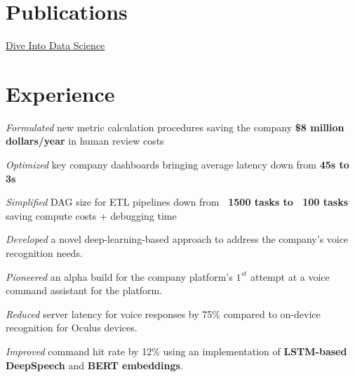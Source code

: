 \documentclass[]{devanshu-resume-openfont}
\begin{document}
\begin{minipage}[t]{0.33\textwidth}
\section{Publications}
\href{https://eldridgejm.github.io/dive_into_data_science/front.html}{Dive Into Data Science}

%
%

\end{minipage}
\hfill
\begin{minipage}[t]{0.66\textwidth}


\section{Experience}
\vspace{\topsep} %
\begin{tightemize}
\item \emph{Formulated} new metric calculation procedures saving the company \textbf{\$8 million dollars/year} in human review costs
\item \emph{Optimized} key company dashboards bringing average latency down from \textbf{45s to 3s}
\item \emph{Simplified} DAG size for ETL pipelines down from \textbf{~1500 tasks to ~100 tasks} saving compute costs + debugging time
\end{tightemize}
\sectionsep

\vspace{\topsep} %
\begin{tightemize}
\item \emph{Developed} a novel deep-learning-based approach to address the company's voice recognition needs.
\item \emph{Pioneered} an alpha build for the company platform's $1^{st}$ attempt at a voice command assistant for the platform.
\item \emph{Reduced} server latency for voice responses by 75\% compared to on-device recognition for Oculus devices.
\item \emph{Improved} command hit rate by 12\% using an implementation of \textbf{LSTM-based DeepSpeech} and \textbf{BERT embeddings}.
\end{tightemize}
\sectionsep


\end{minipage}
\end{document}
